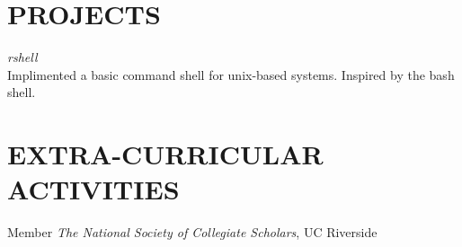 \documentclass[margin, 10pt]{res}
\begin{document}
\begin{resume}
\section{PROJECTS}

{\sl rshell} \\
Implimented a basic command shell for unix-based systems.
Inspired by the bash shell.



\section{EXTRA-CURRICULAR \\ ACTIVITIES} 

Member {\it The National Society of Collegiate Scholars}, UC Riverside \\

\end{resume}
\end{document}

